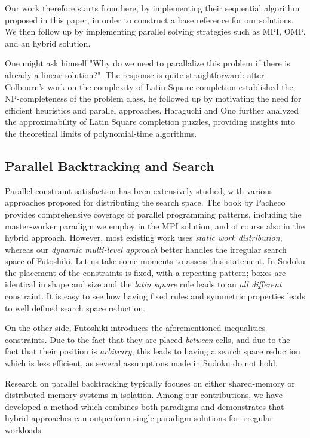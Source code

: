 Our work therefore starts from here, by implementing their sequential algorithm proposed in this paper, in order to construct a base reference for our solutions. We then follow up by implementing parallel solving strategies such as MPI, OMP, and an hybrid solution.


One might ask himself "Why do we need to parallalize this problem if there is already a linear solution?". The response is quite straightforward: after Colbourn's work \cite{Colbourn1984} on the complexity of Latin Square completion established the NP-completeness of the problem class, he followed up by motivating the need for efficient heuristics and parallel approaches. Haraguchi and Ono \cite{Haraguchi2014} further analyzed the approximability of Latin Square completion puzzles, providing insights into the theoretical limits of polynomial-time algorithms.

\subsection{Parallel Backtracking and Search}
\label{subsec:backtrack}
Parallel constraint satisfaction has been extensively studied, with various approaches proposed for distributing the search space. The book by Pacheco \cite{Pacheco2011} provides comprehensive coverage of parallel programming patterns, including the master-worker paradigm we employ in the MPI solution, and of course also in the hybrid approach. However, most existing work uses \textit{static work distribution}, whereas our \textit{dynamic multi-level approach} better handles the irregular search space of Futoshiki.
Let us take some moments to assess this statement.
In Sudoku the placement of the constraints is fixed, with a repeating pattern; boxes are identical in shape and size and the \textit{latin square} rule leads to an \textit{all different} constraint. It is easy to see how having fixed rules and symmetric properties leads to well defined search space reduction.

On the other side, Futoshiki introduces the aforementioned inequalities constraints. Due to the fact that they are placed \textit{between} cells, and due to the fact that their position is \textit{arbitrary}, this leads to having a search space reduction which is less efficient, as several assumptions made in Sudoku do not hold.

Research on parallel backtracking typically focuses on either shared-memory or distributed-memory systems in isolation. Among our contributions, we have developed a method which combines both paradigms and demonstrates that hybrid approaches can outperform single-paradigm solutions for irregular workloads.

